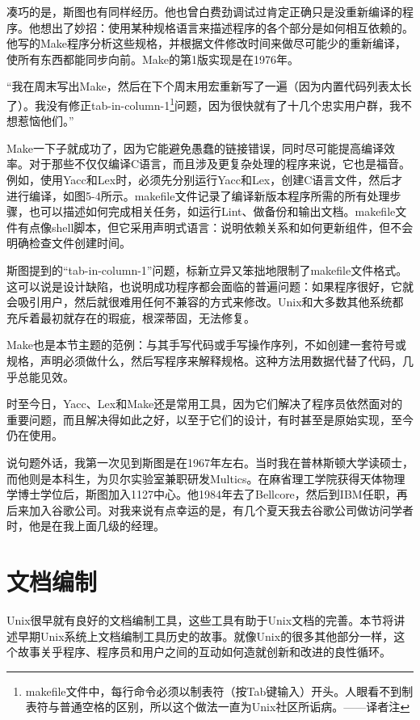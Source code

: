\documentclass[a4paper,12pt,UTF8,twoside]{ctexbook}
\begin{document}
凑巧的是，斯图也有同样经历。他也曾白费劲调试过肯定正确只是没重新编译的程序。他想出了妙招：使用某种规格语言来描述程序的各个部分是如何相互依赖的。他写的Make程序分析这些规格，并根据文件修改时间来做尽可能少的重新编译，使所有东西都能同步向前。Make的第1版实现是在1976年。

“我在周末写出Make，然后在下个周末用宏重新写了一遍（因为内置代码列表太长了）。我没有修正tab-in-column-1\footnote{makefile文件中，每行命令必须以制表符（按Tab键输入）开头。人眼看不到制表符与普通空格的区别，所以这个做法一直为Unix社区所诟病。——译者注}问题，因为很快就有了十几个忠实用户群，我不想惹恼他们。”

Make一下子就成功了，因为它能避免愚蠢的链接错误，同时尽可能提高编译效率。对于那些不仅仅编译C语言，而且涉及更复杂处理的程序来说，它也是福音。例如，使用Yacc和Lex时，必须先分别运行Yacc和Lex，创建C语言文件，然后才进行编译，如图5-4所示。makefile文件记录了编译新版本程序所需的所有处理步骤，也可以描述如何完成相关任务，如运行Lint、做备份和输出文档。makefile文件有点像shell脚本，但它采用声明式语言：说明依赖关系和如何更新组件，但不会明确检查文件创建时间。

斯图提到的“tab-in-column-1”问题，标新立异又笨拙地限制了makefile文件格式。这可以说是设计缺陷，也说明成功程序都会面临的普遍问题：如果程序很好，它就会吸引用户，然后就很难用任何不兼容的方式来修改。Unix和大多数其他系统都充斥着最初就存在的瑕疵，根深蒂固，无法修复。

Make也是本节主题的范例：与其手写代码或手写操作序列，不如创建一套符号或规格，声明必须做什么，然后写程序来解释规格。这种方法用数据代替了代码，几乎总能见效。

时至今日，Yacc、Lex和Make还是常用工具，因为它们解决了程序员依然面对的重要问题，而且解决得如此之好，以至于它们的设计，有时甚至是原始实现，至今仍在使用。

说句题外话，我第一次见到斯图是在1967年左右。当时我在普林斯顿大学读硕士，而他则是本科生，为贝尔实验室兼职研发Multics。在麻省理工学院获得天体物理学博士学位后，斯图加入1127中心。他1984年去了Bellcore，然后到IBM任职，再后来加入谷歌公司。对我来说有点幸运的是，有几个夏天我去谷歌公司做访问学者时，他是在我上面几级的经理。

\section{文档编制}

Unix很早就有良好的文档编制工具，这些工具有助于Unix文档的完善。本节将讲述早期Unix系统上文档编制工具历史的故事。就像Unix的很多其他部分一样，这个故事关乎程序、程序员和用户之间的互动如何造就创新和改进的良性循环。
\end{document}
